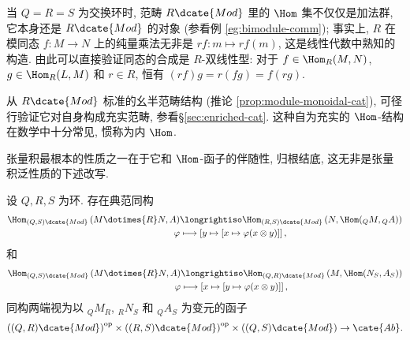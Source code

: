 \begin{remark}\label{rem:module-internal-Hom} 
	当 $Q=R=S$ 为交换环时, 范畴 $R\dcate{Mod}$ 里的 $\Hom$ 集不仅仅是加法群, 它本身还是 $R\dcate{Mod}$ 的对象 (参看例 \ref{eg:bimodule-comm}); 事实上, $R$ 在模同态 $f: M \to N$ 上的纯量乘法无非是 $rf: m \mapsto rf(m)$, 这是线性代数中熟知的构造. 由此可以直接验证同态的合成是 $R$-双线性型: 对于 $f \in \Hom_R(M,N)$, $g \in \Hom_R(L,M)$ 和 $r \in R$, 恒有 $(rf)g = r(fg) = f(rg)$.

	从 $R\dcate{Mod}$ 标准的幺半范畴结构 (推论 \ref{prop:module-monoidal-cat}), 可径行验证它对自身构成充实范畴, 参看\S \ref{sec:enriched-cat}. 这种自为充实的 $\Hom$-结构在数学中十分常见, 惯称为内 $\Hom$.
\end{remark}

张量积最根本的性质之一在于它和 $\Hom$-函子的伴随性, 归根结底, 这无非是张量积泛性质的下述改写.
\begin{theorem}\label{prop:Hom-tensor-adjunction}
	设 $Q, R, S$ 为环. 存在典范同构
	\begin{align*}
		\Hom_{(Q,S)\dcate{Mod}} \left( M \dotimes{R} N, A \right) & \longrightiso \Hom_{(R,S)\dcate{Mod}} \left( N, \Hom({}_Q M, {}_Q A) \right) \\
		\varphi & \longmapsto \left[ y \mapsto [x \mapsto \varphi(x \otimes y)] \right],
	\end{align*}
	和
	\begin{align*}
		\Hom_{(Q,S)\dcate{Mod}} \left( M \dotimes{R} N, A \right) & \longrightiso \Hom_{(Q,R)\dcate{Mod}} \left( M, \Hom(N_S, A_S) \right) \\
		\varphi & \longmapsto \left[ x \mapsto [y \mapsto \varphi(x \otimes y)] \right],
	\end{align*}
	同构两端视为以 ${}_Q M_R$, ${}_R N_S$ 和 ${}_Q A_S$ 为变元的函子
  \[ \left( (Q, R)\dcate{Mod}\right)^\text{op} \times \left((R, S)\dcate{Mod}\right)^\text{op} \times \left((Q, S)\dcate{Mod}\right) \to \cate{Ab}. \]
\end{theorem}
